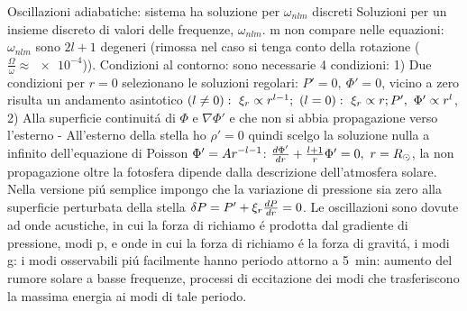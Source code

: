 \begin{frame}{Oscillazioni adiabatiche: sistema ha soluzione per $\omega_{nlm}$ discreti}
Soluzioni per un insieme discreto di valori delle frequenze, $\omega_{nlm}$. m non compare nelle equazioni: $\omega_{nlm}$ sono $2l+1$ degeneri (rimossa nel caso si tenga conto della rotazione ($\frac{\Omega}{\omega}\approx\num{e-4}$)). Condizioni al contorno: sono necessarie 4 condizioni: 1) Due condizioni per $r=0$ selezionano le soluzioni regolari: $P'=0,\ \Phi'=0$, vicino a zero risulta un andamento asintotico $(l\neq0):\ \xi_r\propto r\expy{l-1};\ (l=0):\ \xi_r\propto r;P',\ \Phi'\propto r^l$, 2) Alla superficie continuit\'a di $\Phi$ e $\nabla\Phi'$ e che non si abbia propagazione verso l'esterno - All'esterno della stella ho $\rho'=0$ quindi scelgo la soluzione nulla a infinito dell'equazione di Poisson $\Phi'=Ar\expy{-l-1}$: $\TDy{r}{\Phi'}+\frac{l+1}{r}\Phi'=0,\ r=\rsun{}$, la non propagazione oltre la fotosfera dipende dalla descrizione dell'atmosfera solare. Nella versione pi\'u semplice impongo che la variazione di pressione sia zero alla superficie perturbata della stella $\Lvar{P}=P'+\xi_r\TDy{r}{P}=0$. Le oscillazioni sono dovute ad onde acustiche, in cui la forza di richiamo \'e prodotta dal gradiente di pressione, modi p, e onde in cui la forza di richiamo \'e la forza di gravit\'a, i modi g: i modi osservabili pi\'u facilmente hanno periodo attorno a \SI{5}{\minute}: aumento del rumore solare a basse frequenze, processi di eccitazione dei modi che trasferiscono la massima energia ai modi di tale periodo.
\end{frame}

